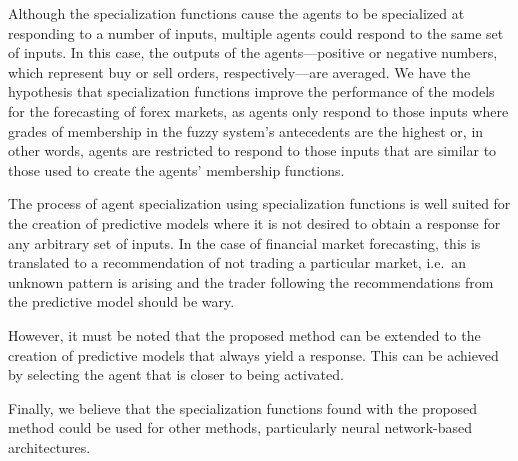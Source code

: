 \documentclass{ieeeaccess}
\begin{document}
Although the specialization functions cause the agents to be specialized at responding to a number of inputs, multiple agents could respond to the same set of inputs.
In this case, the outputs of the agents---positive or negative numbers, which represent buy or sell orders, respectively---are averaged. We have the hypothesis that specialization functions improve the performance of the models for the forecasting of forex markets, as agents only respond to those inputs where grades of membership in the fuzzy system's antecedents are the highest or, in other words, agents are restricted to respond to those inputs that are similar to those used to create the agents' membership functions.


The process of agent specialization using specialization functions is well suited for the creation of predictive models where it is not desired to obtain a response for any arbitrary set of inputs. In the case of financial market forecasting, this is translated to a recommendation of not trading a particular market, i.e.\ an unknown pattern is arising and the trader following the recommendations from the predictive model should be wary.

However, it must be noted that the proposed method can be extended to the creation of predictive models that always yield a response. This can be achieved by selecting the agent that is closer to being activated.

Finally, we believe that the specialization functions found with the proposed method could be used for other methods, particularly neural network-based architectures.
\end{document}
